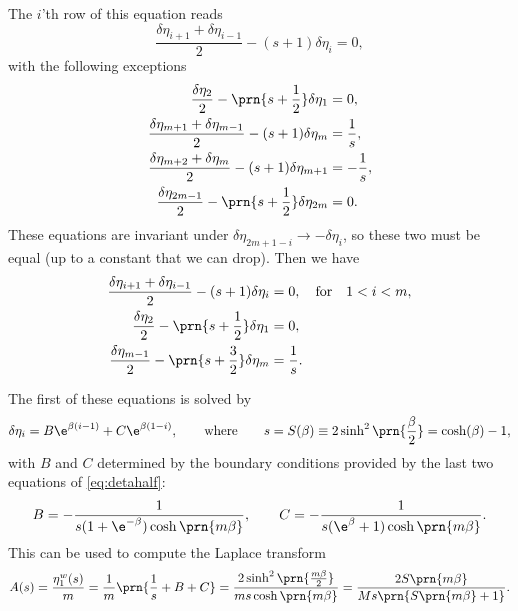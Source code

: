 \documentclass[12pt]{article}
\newcommand{\etwm}{\eta^w}
\begin{document}
The \(i\)'th row of this equation reads
%
\begin{equation}\label{eq:detarow}
  \frac{\delta\eta_{i+1}+\delta\eta_{i-1}}{2} - (s+1)\delta\eta_i = 0,
\end{equation}
%
with the following exceptions
%
\begin{equation}\label{eq:detabnduni}
\begin{aligned}
  \frac{\delta\eta_2}{2} - \prn{s+\frac{1}{2}}\delta\eta_1 &= 0, \\
  \frac{\delta\eta_{m+1}+\delta\eta_{m-1}}{2} - (s+1)\delta\eta_{m} &= \frac{1}{s},\\
  \frac{\delta\eta_{m+2}+\delta\eta_{m}}{2} - (s+1)\delta\eta_{m+1} &= -\frac{1}{s},\\
  \frac{\delta\eta_{2m-1}}{2} - \prn{s+\frac{1}{2}}\delta\eta_{2m} &= 0.
\end{aligned}
\end{equation}
%
These equations are invariant under \(\delta\eta_{2m+1-i} \to -\delta\eta_i\), so these two must be equal (up to a constant that we can drop).
Then we have
%
\begin{equation}\label{eq:detahalf}
\begin{aligned}
  \frac{\delta\eta_{i+1}+\delta\eta_{i-1}}{2} - (s+1)\delta\eta_i &= 0,
  \quad\text{for}\quad 1<i<m, \\
  \frac{\delta\eta_2}{2} - \prn{s+\frac{1}{2}}\delta\eta_1 &= 0, \\
  \frac{\delta\eta_{m-1}}{2} - \prn{s+\frac{3}{2}}\delta\eta_{m} &= \frac{1}{s}.
\end{aligned}
\end{equation}
%

The first of these equations is solved by
%
\begin{equation}\label{eq:detagensol}
  \delta\eta_i = B\e^{\beta(i-1)} + C\e^{\beta(1-i)},
  \qquad\text{where}\qquad
  s = S(\beta) \equiv 2 \sinh^2 \prn{\frac{\beta}{2}}
    = \cosh (\beta) - 1,
\end{equation}
%
with \(B\) and \(C\) determined by the boundary conditions provided by the last two equations of \eqref{eq:detahalf}:
%
\begin{equation}\label{eq:unicoeffs}
  B = -\frac{1}{s(1 + \e^{-\beta}) \cosh \prn{m \beta}},
  \qquad
  C = -\frac{1}{s(\e^{\beta} + 1) \cosh \prn{m \beta}}.
\end{equation}
%
This can be used to compute the Laplace transform
%
\begin{equation}\label{eq:unilaplace}
  A(s) = \frac{\etwm_1(s)}{m}
   = \frac{1}{m}\prn{\frac{1}{s}+B+C}
   = \frac{2\sinh^2\prn{\frac{m \beta}{2}}}{m s \cosh\prn{m \beta}}
   = \frac{2 S\prn{m \beta}}{M s \prn{S\prn{m \beta} + 1}}.
\end{equation}
%
\end{document}

